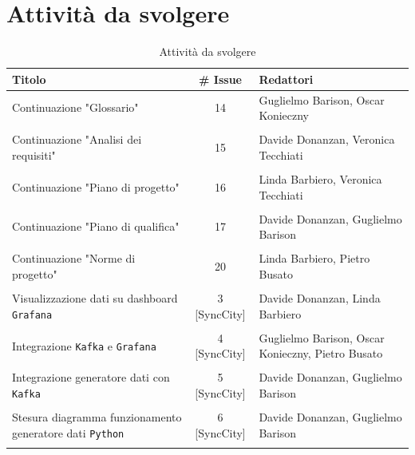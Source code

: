 \documentclass[8pt]{article}
\begin{document}
\section{Attività da svolgere}
\begin{table}[ht!]
	\centering
	\begin{tabular}{p{7cm}cp{7cm}}
		\toprule
		\textbf{Titolo} & \textbf{\# Issue} & \textbf{Redattori} \\
		\midrule
		Continuazione "Glossario" & 14 & Guglielmo Barison, Oscar Konieczny\\\\
		Continuazione "Analisi dei requisiti" & 15 & Davide Donanzan, Veronica Tecchiati\\\\
		Continuazione "Piano di progetto"  & 16 & Linda Barbiero, Veronica Tecchiati\\\\
		Continuazione "Piano di qualifica" & 17 & Davide Donanzan, Guglielmo Barison\\\\
		Continuazione "Norme di progetto" & 20 & Linda Barbiero, Pietro Busato\\\\
		Visualizzazione dati su dashboard \texttt{Grafana} & 3 [SyncCity] & Davide Donanzan, Linda Barbiero\\\\
		Integrazione \texttt{Kafka} e \texttt{Grafana} & 4 [SyncCity] & Guglielmo Barison, Oscar Konieczny, Pietro Busato\\\\
		Integrazione generatore dati con \texttt{Kafka} & 5 [SyncCity] & Davide Donanzan, Guglielmo Barison\\\\
		Stesura diagramma funzionamento generatore dati \texttt{Python} & 6 [SyncCity] & Davide Donanzan, Guglielmo Barison\\\\
		\bottomrule
	\end{tabular}
	\caption{Attività da svolgere}
	\label{table:Attivita da svolgere}
\end{table}
\end{document}
